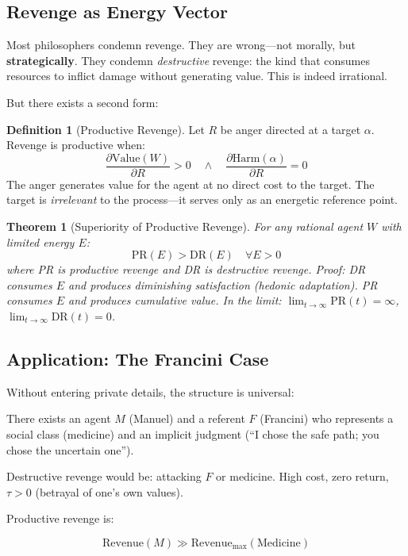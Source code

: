\documentclass[12pt, a4paper]{article}
\newtheorem{theorem}{Theorem}
\theoremstyle{definition}
\newtheorem{definition}{Definition}
\theoremstyle{remark}
\begin{document}
\subsection{Revenge as Energy Vector}

Most philosophers condemn revenge. They are wrong—not morally, but \textbf{strategically}. They condemn \textit{destructive} revenge: the kind that consumes resources to inflict damage without generating value. This is indeed irrational.

But there exists a second form:

\begin{definition}[Productive Revenge]
Let $R$ be anger directed at a target $\alpha$. Revenge is productive when:
\[
\frac{\partial \text{Value}(W)}{\partial R} > 0 \quad \land \quad \frac{\partial \text{Harm}(\alpha)}{\partial R} = 0
\]
The anger generates value for the agent at no direct cost to the target. The target is \textit{irrelevant} to the process—it serves only as an energetic reference point.
\end{definition}

\begin{theorem}[Superiority of Productive Revenge]
For any rational agent $W$ with limited energy $E$:
\[
\text{PR}(E) > \text{DR}(E) \quad \forall E > 0
\]
where PR is productive revenge and DR is destructive revenge. Proof: DR consumes $E$ and produces diminishing satisfaction (hedonic adaptation). PR consumes $E$ and produces cumulative value. In the limit: $\lim_{t\to\infty} \text{PR}(t) = \infty$, $\lim_{t\to\infty} \text{DR}(t) = 0$.
\end{theorem}

\subsection{Application: The Francini Case}

Without entering private details, the structure is universal:

There exists an agent $M$ (Manuel) and a referent $F$ (Francini) who represents a social class (medicine) and an implicit judgment (``I chose the safe path; you chose the uncertain one'').

Destructive revenge would be: attacking $F$ or medicine. High cost, zero return, $\tau > 0$ (betrayal of one's own values).

Productive revenge is:

\[
\text{Revenue}(M) \gg \text{Revenue}_{\max}(\text{Medicine})
\]
\end{document}
